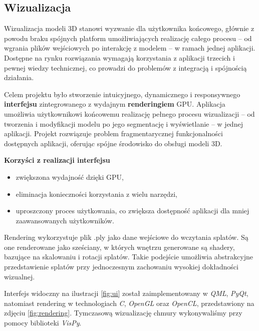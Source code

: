\subsection{Wizualizacja}
Wizualizacja modeli 3D stanowi wyzwanie dla użytkownika końcowego,
głównie z powodu braku spójnych platform umożliwiających realizację
całego procesu – od wgrania plików wejściowych po interakcję z modelem – w ramach jednej aplikacji.
Dostępne na rynku rozwiązania wymagają korzystania z aplikacji trzecich i pewnej wiedzy technicznej,
co prowadzi do problemów z integracją i spójnością działania.

Celem projektu było stworzenie intuicyjnego, dynamicznego i responsywnego \textbf{interfejsu} zintegrowanego z wydajnym \textbf{renderingiem} GPU.
Aplikacja umożliwia użytkownikowi końcowemu realizację pełnego procesu
wizualizacji – od tworzenia i modyfikacji modelu po jego segmentację i wyświetlanie – w jednej aplikacji.
Projekt rozwiązuje problem fragmentarycznej funkcjonalności dostępnych aplikacji, oferując spójne środowisko do obsługi modeli 3D.

\textbf{Korzyści z realizacji interfejsu}

\begin{itemize}
    \item zwiększona wydajność dzięki GPU,
    \item eliminacja konieczności korzystania z wielu narzędzi,
    \item uproszczony proces użytkowania, co zwiększa dostępność aplikacji dla mniej zaawansowanych użytkowników.
\end{itemize}

Rendering wykorzystuje plik .ply jako dane wejściowe do wczytania splatów.
Są one renderowane jako sześciany, w których wnętrzu generowane są shadery, bazujące na skalowaniu i rotacji splatów.
Takie podejście umożliwia abstrakcyjne przedstawienie splatów przy jednoczesnym zachowaniu wysokiej dokładności wizualnej.

Interfejs widoczny na ilustracji \ref{fig:ui} został zaimplementowany w \textit{QML}, \textit{PyQt}, natomiast rendering w technologiach \textit{C}, \textit{OpenGL} oraz \textit{OpenCL}, przedstawiony na zdjęciu \ref{fig:rendering}. Tymczasową wizualizację chmury wykonywaliśmy przy pomocy biblioteki \textit{VisPy}.


